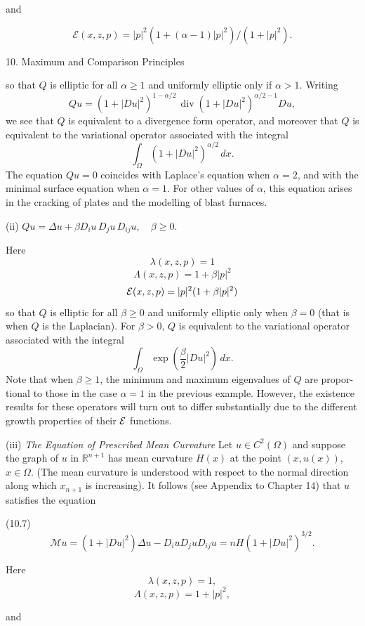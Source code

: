 and

\[
\mathcal{E}(x, z, p)=|p|^2(1+(\alpha-1)|p|^2)/(1+|p|^2).
\]

\pagestyle{empty}

10. Maximum and Comparison Principles

so that $Q$ is elliptic for all $\alpha\ge 1$ and uniformly elliptic only if $\alpha>1$. Writing
\[
Qu=(1+|Du|^2)^{1-\alpha/2}\,\operatorname{div}(1+|Du|^2)^{\alpha/2-1}Du,
\]
we see that $Q$ is equivalent to a divergence form operator, and moreover that $Q$ is
equivalent to the variational operator associated with the integral
\[
\int_{\Omega}(1+|Du|^2)^{\alpha/2}\,dx.
\]
The equation $Qu=0$ coincides with Laplace's equation when $\alpha=2$, and with the
minimal surface equation when $\alpha=1$. For other values of $\alpha$, this equation arises in
the cracking of plates and the modelling of blast furnaces.

(ii) $Qu=\Delta u+\beta D_i u\,D_j u\,D_{ij}u,\quad \beta\ge 0.$

Here
\[
\lambda(x,z,p)=1
\]
\[
\Lambda(x,z,p)=1+\beta|p|^2
\]
\[
\mathcal{E}(x,z,p)=|p|^2(1+\beta|p|^2)
\]
so that $Q$ is elliptic for all $\beta\ge 0$ and uniformly elliptic only when $\beta=0$ (that is
when $Q$ is the Laplacian). For $\beta>0$, $Q$ is equivalent to the variational operator
associated with the integral
\[
\int_{\Omega}\exp\!\left(\frac{\beta}{2}|Du|^2\right)\,dx.
\]
Note that when $\beta\ge 1$, the minimum and maximum eigenvalues of $Q$ are propor-
tional to those in the case $\alpha=1$ in the previous example. However, the existence
results for these operators will turn out to differ substantially due to the different
growth properties of their $\mathcal{E}$ functions.

(iii) \emph{The Equation of Prescribed Mean Curvature}
Let $u\in C^2(\Omega)$ and suppose the graph of $u$ in $\mathbb R^{n+1}$ has mean curvature $H(x)$ at the
point $(x,u(x))$, $x\in\Omega$. (The mean curvature is understood with respect to the
normal direction along which $x_{n+1}$ is increasing). It follows (see Appendix to
Chapter 14) that $u$ satisfies the equation

(10.7) \[ \mathcal{M}u=(1+|Du|^2)\Delta u-D_i uD_j uD_{ij}u=nH(1+|Du|^2)^{3/2}. \]

Here
\[
\lambda(x,z,p)=1,
\]
\[
\Lambda(x,z,p)=1+|p|^2,
\]



and

